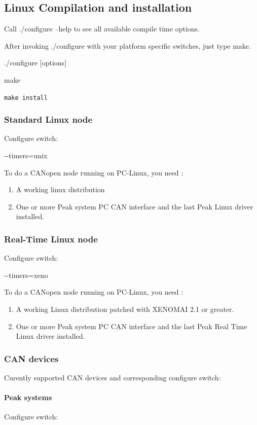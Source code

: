 \documentclass[12pt,twoside]{article}
\newcommand\textstyleTeletype[1]{\texttt{#1}}
\newcommand\liststyleLvii{%
\renewcommand\labelitemi{{--}}
\renewcommand\labelitemii{{--}}
\renewcommand\labelitemiii{{--}}
\renewcommand\labelitemiv{{--}}
}
\newcommand\liststyleLviii{%
\renewcommand\labelitemi{{--}}
\renewcommand\labelitemii{{--}}
\renewcommand\labelitemiii{{--}}
\renewcommand\labelitemiv{{--}}
}
\begin{document}
\subsection{Linux Compilation and installation}
Call ./configure {--}help to see all available compile time options.

After invoking ./configure with your platform specific switches, just
type make.

{\ttfamily
./configure [options]}

{\ttfamily
make}

{\ttfamily
\textstyleTeletype{make install}}

\subsubsection{Standard Linux node}
Configure switch:

{\ttfamily
 {}-{}-timers=unix}

To do a CANopen node running on PC{}-Linux, you need :

\liststyleLvii
\begin{enumerate}
\item A working linux distribution
\item One or more Peak system PC CAN interface and the last Peak Linux
driver installed.
\end{enumerate}
\subsubsection{Real{}-Time Linux node}
Configure switch:

{\ttfamily
 {}-{}-timers=xeno}

To do a CANopen node running on PC{}-Linux, you need :

\liststyleLviii
\begin{enumerate}
\item A working Linux distribution patched with XENOMAI 2.1 or greater.
\item One or more Peak system PC CAN interface and the last Peak Real
Time Linux driver installed.
\end{enumerate}
\subsubsection{CAN devices}
Curently supported CAN devices and corresponding configure switch:

\paragraph{Peak systems}
Configure switch:
\end{document}
